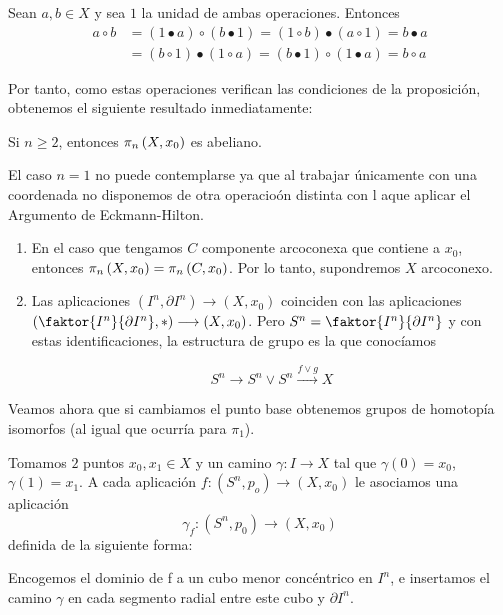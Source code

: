 \begin{demo}
Sean $a,b \in X$ y sea $1$ la unidad de ambas operaciones. Entonces
\begin{align*}
a \circ b &= (1 \bullet a) \circ (b \bullet 1) = (1 \circ b) \bullet (a \circ 1) = b \bullet a  \\
&= (b \circ 1) \bullet (1 \circ a) = (b \bullet 1) \circ (1 \bullet a) = b \circ a
\end{align*}
\end{demo}
Por tanto, como estas operaciones verifican las condiciones de la proposición, obtenemos el siguiente resultado inmediatamente:
\begin{teor}
Si $n \geq 2$, entonces $\pi_{n}\left(X, x_0\right)$ es abeliano.
\end{teor}
El caso $n=1$ no puede contemplarse ya que al trabajar únicamente con una coordenada no disponemos de otra operacioón distinta con l aque aplicar el Argumento de Eckmann-Hilton.
\begin{custom}[Observaciones]
\begin{enumerate}
\item En el caso que tengamos $C$ componente arcoconexa que contiene a $x_0$, entonces $\pi_{n}\left(X, x_0\right) = \pi_{n}\left(C, x_0\right)$. Por lo tanto, supondremos $X$ arcoconexo.

\item Las aplicaciones $ (I^n, \partial I^n) \longrightarrow (X, x_0)$ coinciden con las aplicaciones $(\faktor{I^n}{\partial I^n}, \ast) \longrightarrow (X, x_0)$. Pero $S^n = \faktor{I^n}{\partial I^n}$ y con estas identificaciones, la estructura de grupo es la que conocíamos \par
{}
\[S^n \longrightarrow S^n \vee S^n \stackrel{f \vee g}{\longrightarrow} X \]
\end{enumerate}
\end{custom}
Veamos ahora que si cambiamos el punto base obtenemos grupos de homotopía isomorfos (al igual que ocurría para $\pi_1$). \par
Tomamos $2$ puntos $x_0, x_1 \in X$ y un camino $\gamma : I \longrightarrow X$ tal que $\gamma(0) = x_0$, $\gamma(1) = x_1$. A cada aplicación $f : (S^n, p_o) \longrightarrow (X, x_0)$ le asociamos una aplicación
\[
\gamma_f : (S^n, p_0) \longrightarrow (X, x_0)
\]
definida de la siguiente forma: \par
Encogemos el dominio de f a un cubo menor concéntrico en $I^n$, e insertamos el camino $\gamma$ en cada segmento radial entre este cubo y $\partial I^n$.  \par
